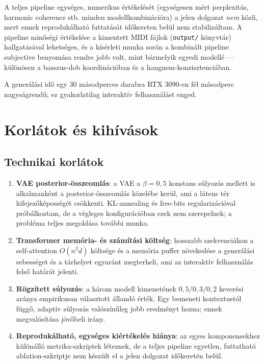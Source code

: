A teljes pipeline egységes, numerikus értékelését (egységesen mért perplexitás, harmonic coherence stb. minden modellkombinációra) a jelen dolgozat \emph{nem} közli, mert ennek reprodukálható futtatását időkereten belül nem stabilizáltam. A pipeline minőségi értékelése a kimentett MIDI fájlok (\texttt{output/} könyvtár) hallgatásával lehetséges, és a kísérleti munka során a kombinált pipeline subjective benyomása rendre jobb volt, mint bármelyik egyedi modellé --- különösen a basszus-dob koordinációban és a hangnem-konzisztenciában.

A generálási idő egy 30 másodperces darabra RTX 3090-en fél másodperc nagyságrendű; ez gyakorlatilag interaktív felhasználást enged.

\section{Korlátok és kihívások}

\subsection{Technikai korlátok}

\begin{enumerate}
  \item \textbf{VAE posterior-összeomlás}: a VAE a $\beta = 0{,}5$ konstans súlyozás mellett is alkalmanként a posterior-összeomlás közelébe kerül, ami a látens tér kifejezőképességét csökkenti. KL-annealing és free-bits regularizációval próbálkoztam, de a végleges konfigurációban ezek nem szerepelnek; a probléma teljes megoldása további munka.

  \item \textbf{Transformer memória- és számítási költség}: hosszabb szekvenciákon a self-attention $O(n^2 d)$ költsége és a memória puffer növekedése a generálási sebességet és a tárhelyet egyaránt megterheli, ami az interaktív felhasználás felső határát jelenti.

  \item \textbf{Rögzített súlyozás}: a három modell kimenetének $0{,}5 / 0{,}3 / 0{,}2$ keverési aránya empirikusan választott állandó érték. Egy bemeneti kontextustól függő, adaptív súlyozás valószínűleg jobb eredményt hozna; ennek megvalósítása jövőbeli irány.

  \item \textbf{Reprodukálható, egységes kiértékelés hiánya}: az egyes komponensekhez különálló metrika-szkriptek léteznek, de a teljes pipeline egyetlen, futtatható ablation-szkriptje nem készült el a jelen dolgozat időkeretén belül.
\end{enumerate}

